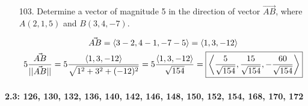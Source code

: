 \documentclass[10pt, letterpaper]{article}
\begin{document}
\begin{itemize}
        \item [103.] Determine a vector of magnitude 5 in the direction of vector $\vec{AB}$, where $A(2, 1, 5)$ and $B(3, 4, -7)$.
        
        \begin{mdframed}
            \begin{equation*}
                \begin{gathered}
                    \vec{AB} = \expval{3 - 2, 4 - 1, -7 - 5} = \expval{1, 3, -12}   \\
                    5\frac{\vec{AB}}{||\vec{AB}||}
                        = 5\frac{\expval{1, 3, -12}}{\sqrt{1^2 + 3^2 + (-12)^2}}
                        = 5\frac{\expval{1, 3, -12}}{\sqrt{154}}
                        = \boxed{\expval{\frac{5}{\sqrt{154}}, \frac{15}{\sqrt{154}}, -\frac{60}{\sqrt{154}}}}
                \end{gathered}
            \end{equation*}
        \end{mdframed}

    \end{itemize}

    \pagebreak

    \paragraph*{2.3: 126, 130, 132, 136, 140, 142, 146, 148, 150, 152, 154, 168, 170, 172}
\end{document}
